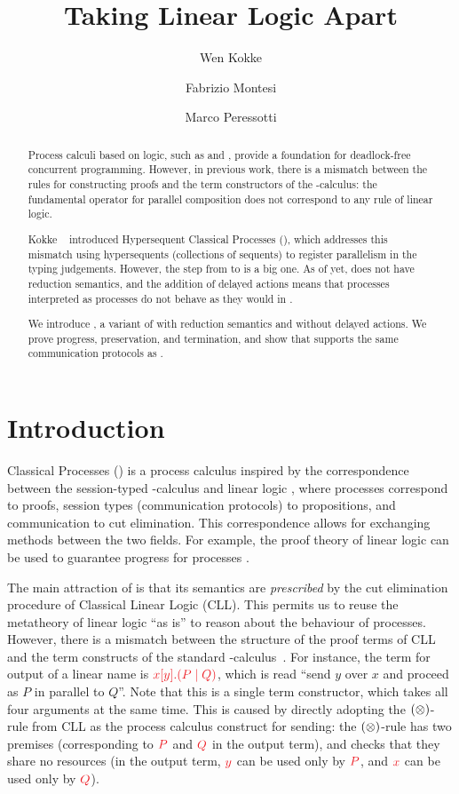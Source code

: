 \documentclass[submission,copyright,creativecommons]{eptcs}
\title{Taking Linear Logic Apart}
\author{%
  Wen Kokke
  \institute{University of Edinburgh\\ Edinburgh, Scotland}
  \email{wen.kokke@ed.ac.uk}
  \and
  Fabrizio Montesi
  \institute{University of Southern Denmark\\ Odense, Denmark}
  \email{fmontesi@imada.sdu.dk}
  \and
  Marco Peressotti
  \institute{University of Southern Denmark\\ Odense, Denmark}
  \email{peressotti@imada.sdu.dk}}
\begin{document}
\maketitle

\begin{abstract}
  Process calculi based on logic, such as \piDILL and \cp, provide a foundation for deadlock-free concurrent programming. However, in previous work, there is a mismatch between the rules for constructing proofs and the term constructors of the \textpi-calculus: the fundamental operator for parallel composition does not correspond to any rule of linear logic.

  Kokke \etal~\cite{kokke2019} introduced Hypersequent Classical Processes (\dhcp), which addresses this mismatch using hypersequents (collections of sequents) to register parallelism in the typing judgements.
  However, the step from \cp to \dhcp is a big one. As of yet, \dhcp does not have reduction semantics, and the addition of delayed actions means that \cp processes interpreted as \dhcp processes do not behave as they would in \cp.

  We introduce \hcp, a variant of \dhcp with reduction semantics and without delayed actions. We prove progress, preservation, and termination, and show that \hcp supports the same communication protocols as \cp.
\end{abstract}

\section{Introduction}
\label{sec:introduction}

Classical Processes (\cp) \cite{wadler2012} is a process calculus inspired by the correspondence between the session-typed \textpi-calculus and linear logic \cite{caires2010}, where processes correspond to proofs, session types (communication protocols) to propositions, and communication to cut elimination. This correspondence allows for exchanging methods between the two fields. For example, the proof theory of linear logic can be used to guarantee progress for processes \cite{caires2010,wadler2012}.

The main attraction of \cp is that its semantics are \emph{prescribed} by the cut elimination procedure of Classical Linear Logic (CLL). This permits us to reuse the metatheory of linear logic ``as is'' to reason about the behaviour of processes. However, there is a mismatch between the structure of the proof terms of CLL and the term constructs of the standard \textpi-calculus~\cite{milner1992a,milner1992b}. For instance, the term for output of a linear name is $\tm{\cpSend{x}{y}{P}{Q}}$, which is read ``send $y$ over $x$ and proceed as $P$ in parallel to $Q$''. Note that this is a single term constructor, which takes all four arguments at the same time. This is caused by directly adopting the $(\otimes)$-rule from CLL as the process calculus construct for sending: the $(\otimes)$-rule has two premises (corresponding to $\tm P$ and $\tm Q$ in the output term), and checks that they share no resources (in the output term, $\tm y$ can be used only by $\tm P$, and $\tm x$ can be used only by $\tm Q$).
\end{document}
